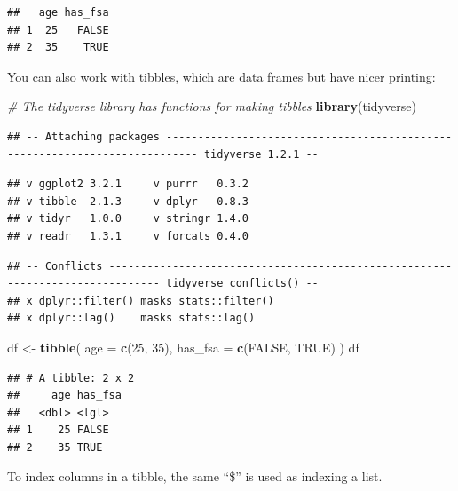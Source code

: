 \documentclass[openany]{book}
\newenvironment{Shaded}{\begin{snugshade}}{\end{snugshade}}
\newcommand{\CommentTok}[1]{\textcolor[rgb]{0.56,0.35,0.01}{\textit{#1}}}
\newcommand{\DataTypeTok}[1]{\textcolor[rgb]{0.13,0.29,0.53}{#1}}
\newcommand{\DecValTok}[1]{\textcolor[rgb]{0.00,0.00,0.81}{#1}}
\newcommand{\KeywordTok}[1]{\textcolor[rgb]{0.13,0.29,0.53}{\textbf{#1}}}
\newcommand{\NormalTok}[1]{#1}
\newcommand{\OperatorTok}[1]{\textcolor[rgb]{0.81,0.36,0.00}{\textbf{#1}}}
\newcommand{\OtherTok}[1]{\textcolor[rgb]{0.56,0.35,0.01}{#1}}
\newcommand{\StringTok}[1]{\textcolor[rgb]{0.31,0.60,0.02}{#1}}
\begin{document}
\begin{verbatim}
##   age has_fsa
## 1  25   FALSE
## 2  35    TRUE
\end{verbatim}

You can also work with tibbles, which are data frames but have nicer printing:

\begin{Shaded}
\begin{Highlighting}[]
\CommentTok{# The tidyverse library has functions for making tibbles}
\KeywordTok{library}\NormalTok{(tidyverse) }
\end{Highlighting}
\end{Shaded}

\begin{verbatim}
## -- Attaching packages --------------------------------------------------------------------------- tidyverse 1.2.1 --
\end{verbatim}

\begin{verbatim}
## v ggplot2 3.2.1     v purrr   0.3.2
## v tibble  2.1.3     v dplyr   0.8.3
## v tidyr   1.0.0     v stringr 1.4.0
## v readr   1.3.1     v forcats 0.4.0
\end{verbatim}

\begin{verbatim}
## -- Conflicts ------------------------------------------------------------------------------ tidyverse_conflicts() --
## x dplyr::filter() masks stats::filter()
## x dplyr::lag()    masks stats::lag()
\end{verbatim}

\begin{Shaded}
\begin{Highlighting}[]
\NormalTok{df <-}\StringTok{ }\KeywordTok{tibble}\NormalTok{(}
  \DataTypeTok{age =} \KeywordTok{c}\NormalTok{(}\DecValTok{25}\NormalTok{, }\DecValTok{35}\NormalTok{), }\DataTypeTok{has_fsa =} \KeywordTok{c}\NormalTok{(}\OtherTok{FALSE}\NormalTok{, }\OtherTok{TRUE}\NormalTok{)}
\NormalTok{)}
\NormalTok{df}
\end{Highlighting}
\end{Shaded}

\begin{verbatim}
## # A tibble: 2 x 2
##     age has_fsa
##   <dbl> <lgl>  
## 1    25 FALSE  
## 2    35 TRUE
\end{verbatim}

To index columns in a tibble, the same ``\$'' is used as indexing a list.

\begin{Shaded}
\end{Shaded}
\end{document}
